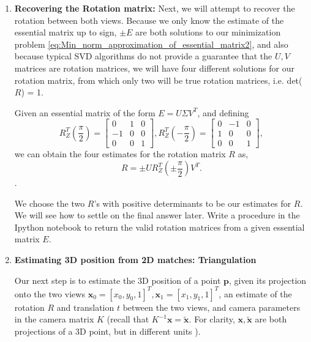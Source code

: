 \begin{enumerate}
    \sol{}
    
\item{\textbf{Recovering the Rotation matrix:}}
    Next, we will attempt to recover the rotation between both views. Because we only know the estimate of the essential matrix up to sign, $\pm E$ are both solutions to our minimization problem \eqref{eq:Min_norm_approximation_of_essential_matrix2}, and also because typical SVD algorithms do not provide a guarantee that the $U,V$ matrices are rotation matrices, we will have four different solutions for our rotation matrix, from which only two will be true rotation matrices, i.e. det($R$) = 1. 
    
    Given an essential matrix of the form $E = U \Sigma V^T$, and defining 
    \begin{equation*}
        R_{Z}^T(\frac{\pi}{2}) = 
        \begin{bmatrix}
             0 & 1 & 0 \\
             -1 & 0 & 0 \\
             0 & 0 & 1 
        \end{bmatrix}, 
        R_{Z}^T(-\frac{\pi}{2}) = 
         \begin{bmatrix}
             0 & -1 & 0 \\
             1 & 0 & 0 \\
             0 & 0 & 1 
        \end{bmatrix},
    \end{equation*} we can obtain the four estimates for the rotation matrix $R$ as, 
    \begin{equation*}
        R = \pm U R_{Z}^T(\pm \frac{\pi}{2}) V^{T}.
    \end{equation*}.
    
    We choose the two $R$'s with positive determinants to be our estimates for $R$. We will see how to settle on the final answer later.  Write a procedure in the Ipython notebook to return the valid rotation matrices from a given essential matrix $E$.

    \sol{}
    
\item{\textbf{Estimating 3D position from 2D matches: Triangulation}}

    Our next step is to estimate the 3D position of a point $\mathbf{p}$, given its projection onto the two views $\mathbf{x}_0 = [x_0, y_0, 1]^T, \mathbf{x}_1 = [x_1, y_1, 1]^T$, an estimate of the rotation $R$ and translation $t$ between the two views, and camera parameters in the camera matrix $K$ (recall that $K^{-1}\mathbf{x} = \tilde{\mathbf{x}}$. For clarity, $\mathbf{x}, \tilde{\mathbf{x}}$ are both projections of a 3D point, but in different units ).
    

\end{enumerate}
